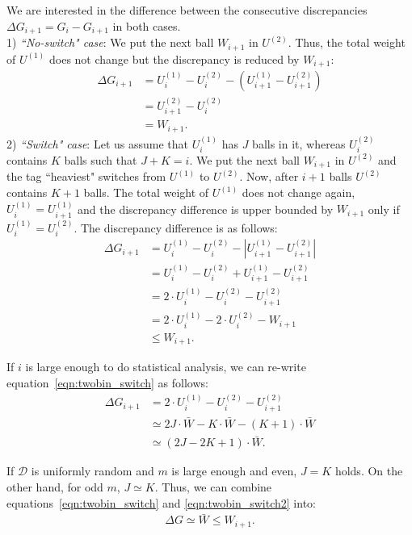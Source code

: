\documentclass[12pt,psfig,a4]{article}
\theoremstyle{plain}
\begin{document}
We are interested in the difference between the consecutive discrepancies $\Delta G_{i+1} = G_{i}-G_{i+1}$ in both cases. \\
1) \textit{``No-switch" case}: We put the next ball $W_{i+1}$ in $U^{(2)}$. Thus, the total weight of $U^{(1)}$ does not change but the discrepancy is reduced by $W_{i+1}$:
\begin{align}
	\Delta G_{i+1}&=U_{i}^{(1)}- U_{i}^{(2)} - (U_{i+1}^{(1)} - U_{i+1}^{(2)}) \\ \nonumber
	&=U_{i+1}^{(2)}- U_{i}^{(2)} \\ 
	&= W_{i+1}.
	\label{eqn:twobin_ns}
\end{align}
2) \textit{``Switch" case}: Let us assume that $U_{i}^{(1)}$ has $J$ balls in it, whereas $U_{i}^{(2)}$ contains $K$ balls such that $J+K=i$. We put the next ball $W_{i+1}$ in $U^{(2)}$ and the tag ``heaviest" switches from $U^{(1)}$ to $U^{(2)}$. Now, after $i+1$ balls $U^{(2)}$ contains $K+1$ balls. The total weight of $U^{(1)}$ does not change again, $U_{i}^{(1)}=U_{i+1}^{(1)}$ and the discrepancy difference is upper bounded by $W_{i+1}$ only if  $U_{i}^{(1)}=U_{i}^{(2)}$. The discrepancy difference is as follows:
\begin{align}
	\Delta G_{i+1}&= U_{i}^{(1)}- U_{i}^{(2)} - \left | U_{i+1}^{(1)} - U_{i+1}^{(2)} \right | \\ \nonumber
	&=U_{i}^{(1)}- U_{i}^{(2)} + U_{i+1}^{(1)} - U_{i+1}^{(2)} \\\  \nonumber
	&=2 \cdot U_{i}^{(1)} - U_{i}^{(2)} - U_{i+1}^{(2)} \\ \nonumber
	&= 2\cdot U_{i}^{(1)} - 2\cdot U_{i}^{(2)} - W_{i+1}   \\
	&\leq W_{i+1}.
	\label{eqn:twobin_switch}
\end{align}

 If $i$ is large enough to do statistical analysis, we can re-write equation~\ref{eqn:twobin_switch} as follows:
\begin{align}
	\nonumber
	\Delta G_{i+1}&=2\cdot U_{i}^{(1)} - U_{i}^{(2)} - U_{i+1}^{(2)} \\ \nonumber
	&\simeq 2J \cdot \bar{W} - K \cdot \bar{W} - (K+1) \cdot \bar{W} \\
	&\simeq (2J-2K+1)\cdot \bar{W} .
	\label{eqn:twobin_switch2}
\end{align}

If $\mathcal{D}$ is uniformly random and $m$ is large enough and even, $J=K$ holds. On the other hand, for odd $m$, $J\simeq K$. Thus, we can combine equations~\ref{eqn:twobin_switch} and \ref{eqn:twobin_switch2} into:
\begin{align}
	\Delta G\simeq \bar{W} \leq W_{i+1}.
	\label{eqn:twobin_switch3}
\end{align}
\end{document}
